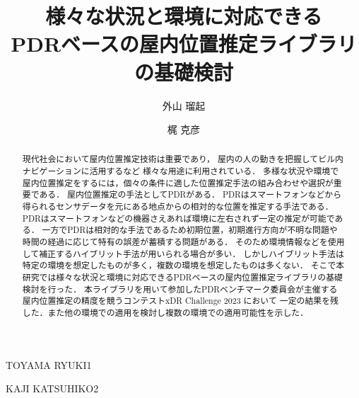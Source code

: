 \documentclass[Japanese]{dicomopapers}
\begin{document}
\title{様々な状況と環境に対応できる\\PDRベースの屋内位置推定ライブラリの基礎検討}



\author{外山 瑠起}{TOYAMA RYUKI}{1}
\author{梶 克彦}{KAJI KATSUHIKO}{2}



\begin{abstract}
	現代社会において屋内位置推定技術は重要であり，
	屋内の人の動きを把握してビル内ナビゲーションに活用するなど
	様々な用途に利用されている．
	多様な状況や環境で屋内位置推定をするには，個々の条件に適した位置推定手法の組み合わせや選択が重要である．
	屋内位置推定の手法としてPDRがある．
	PDRはスマートフォンなどから得られるセンサデータを元にある地点からの相対的な位置を推定する手法である．
	PDRはスマートフォンなどの機器さえあれば環境に左右されず一定の推定が可能である．
	一方でPDRは相対的な手法であるため初期位置，初期進行方向が不明な問題や時間の経過に応じて特有の誤差が蓄積する問題がある．
	そのため環境情報などを使用して補正するハイブリット手法が用いられる場合が多い．
	しかしハイブリット手法は特定の環境を想定したものが多く，複数の環境を想定したものは多くない．
	そこで本研究では様々な状況と環境に対応できるPDRベースの屋内位置推定ライブラリの基礎検討を行った．
	本ライブラリを用いて参加したPDRベンチマーク委員会が主催する屋内位置推定の精度を競うコンテストxDR Challenge 2023 において
	一定の結果を残した．また他の環境での適用を検討し複数の環境での適用可能性を示した．
\end{abstract}

\maketitle


















\end{document}
